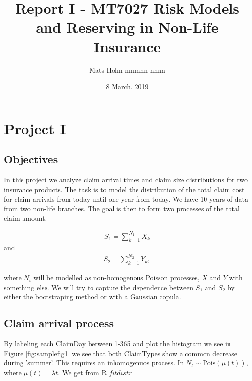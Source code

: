 \documentclass[11pt]{article}
\title{Report I - MT7027 Risk Models and Reserving in Non-Life Insurance}
\author{Mats Holm nnnnnn-nnnn }
\date{8 March, 2019}                                           %
\begin{document}
\maketitle
\section*{Project I}
\subsection*{Objectives}

In this project we analyze claim
arrival times and claim size distributions for two insurance products.
The task is to model
the distribution of the total claim cost for claim arrivals from today until one year from
today. We have 10 years of data from two non-life branches. The goal is then to form two processes of the total claim amount,

\begin{align} \label{eq:sum1}
	S_1 = \sum_{k=1}^{N_1}  X_k 
\end{align}
and
\begin{align} \label{eq:sum2}
	 S_2 = \sum_{k=1}^{N_2} Y_k,
\end{align}

where $N_i$ will be modelled as non-homogenous Poisson processes, $X$ and $Y$ with something else. We will try to capture the dependence between
$S_1$ and $S_2$ by  either the
bootstraping method or with a Gaussian copula.


\subsection*{Claim arrival process}
By labeling each ClaimDay between 1-365 and plot the histogram we see in Figure \ref{fig:samplefig1} we see that both ClaimTypes show a common decrease during 'summer'. This requires an inhomogenuos process. In $N_t  \sim  \mathrm{Pois}(\mu(t))$, where  $\mu(t) = \lambda t$. We get from R $fitdistr$

\end{document}
